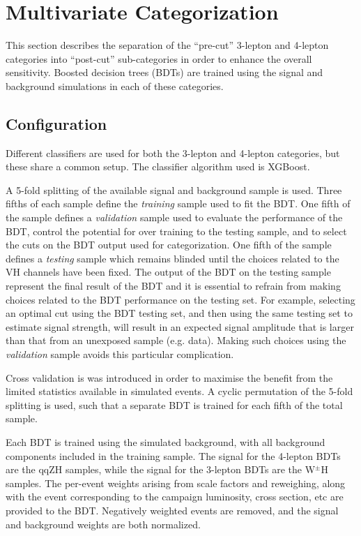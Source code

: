 \section{Multivariate Categorization}\label{sec:hmmBdt}

This section describes the separation of the ``pre-cut'' 3-lepton and 4-lepton categories into ``post-cut'' sub-categories in order to enhance the overall sensitivity.
Boosted decision trees (BDTs) are trained using the signal and background simulations in each of these categories.

\subsection{Configuration}
\label{sec:hmmBdtConfiguration}

Different classifiers are used for both the 3-lepton and 4-lepton categories, but these share a common setup.
The classifier algorithm used is XGBoost.\cite{xgboost} 

A 5-fold splitting of the available signal and background sample is used.
 Three fifths of each sample define the \emph{training} sample used to fit the BDT.
 One fifth of the sample defines a \emph{validation} sample used to evaluate the performance of the BDT, control the potential for over training to the testing sample, and to select the cuts on the BDT output used for categorization.
 One fifth of the sample defines a \emph{testing} sample which remains blinded until the choices related to the VH channels have been fixed.
 The output of the BDT on the testing sample represent the final result of the BDT and it is essential to refrain from making choices related to the BDT performance on the testing set.
 For example, selecting an optimal cut using the BDT testing set, and then using the same testing set to estimate signal strength, will result in an expected signal amplitude that is larger than that from an unexposed sample 
(e.g. data).
 Making such choices using the \emph{validation} sample avoids this particular complication.

Cross validation is was introduced in order to maximise the benefit from the limited statistics available in simulated events. A cyclic permutation of the 5-fold splitting is used, such that a separate BDT is trained for each fifth of the total sample.

Each BDT is trained using the simulated background, with all background components included in the training sample.
The signal for the 4-lepton BDTs are the qqZH samples, while the signal for the 3-lepton BDTs are the W$^\pm$H samples. The per-event weights arising from scale factors and reweighing, along with the event corresponding to the campaign luminosity, cross section, etc are provided to the BDT. Negatively weighted events are removed, and the signal and background weights are both normalized.

